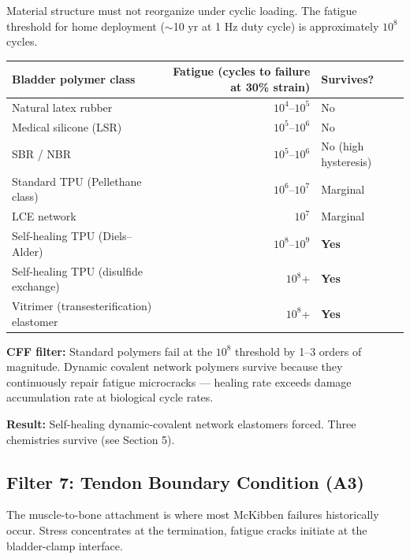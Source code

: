 \documentclass[11pt, a4paper]{article}
\begin{document}
Material structure must not reorganize under cyclic loading. The
fatigue threshold for home deployment ($\sim$10 yr at 1 Hz duty
cycle) is approximately $10^8$ cycles.

\begin{center}
\begin{tabular}{@{}lrl@{}}
\toprule
\textbf{Bladder polymer class} & \textbf{Fatigue (cycles to failure
  at 30\% strain)} & \textbf{Survives?} \\
\midrule
Natural latex rubber & $10^4$--$10^5$ &
  \textcolor{nm-red}{No} \\
Medical silicone (LSR) & $10^5$--$10^6$ &
  \textcolor{nm-red}{No} \\
SBR / NBR & $10^5$--$10^6$ &
  \textcolor{nm-red}{No (high hysteresis)} \\
Standard TPU (Pellethane class) & $10^6$--$10^7$ &
  \textcolor{nm-orange}{Marginal} \\
LCE network & $10^7$ &
  \textcolor{nm-orange}{Marginal} \\
Self-healing TPU (Diels--Alder) & $10^8$--$10^9$ &
  \textcolor{nm-green}{\textbf{Yes}} \\
Self-healing TPU (disulfide exchange) & $10^8$+ &
  \textcolor{nm-green}{\textbf{Yes}} \\
Vitrimer (transesterification) elastomer & $10^8$+ &
  \textcolor{nm-green}{\textbf{Yes}} \\
\bottomrule
\end{tabular}
\end{center}

\textbf{CFF filter:} Standard polymers fail at the $10^8$ threshold
by 1--3 orders of magnitude. Dynamic covalent network polymers
survive because they continuously repair fatigue microcracks ---
healing rate exceeds damage accumulation rate at biological cycle
rates.

\textbf{Result:} Self-healing dynamic-covalent network elastomers
forced. Three chemistries survive (see Section 5).

\subsection{Filter 7: Tendon Boundary Condition (A3)}

The muscle-to-bone attachment is where most McKibben failures
historically occur. Stress concentrates at the termination,
fatigue cracks initiate at the bladder-clamp interface.
\end{document}
